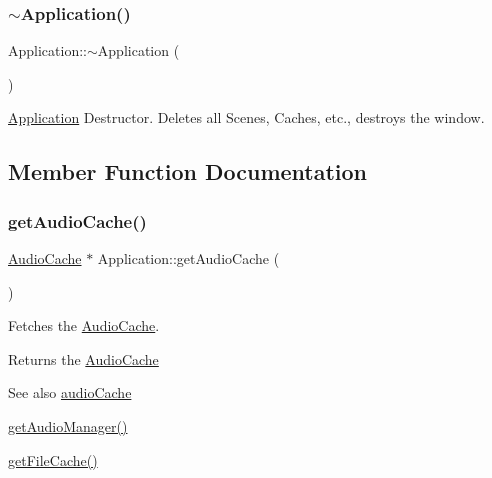 \subsubsection{\texorpdfstring{$\sim$Application()}{~Application()}}
{\footnotesize\ttfamily Application\+::$\sim$\+Application (\begin{DoxyParamCaption}{ }\end{DoxyParamCaption})}



\mbox{\hyperlink{classsage_1_1Application}{Application}} Destructor. Deletes all Scenes, Caches, etc., destroys the window. 



\subsection{Member Function Documentation}
\mbox{\label{classsage_1_1Application_aaed4c540666d784b83d5506e51fb5eaa}} 
\subsubsection{\texorpdfstring{getAudioCache()}{getAudioCache()}}
{\footnotesize\ttfamily \mbox{\hyperlink{classsage_1_1AudioCache}{Audio\+Cache}} $\ast$ Application\+::get\+Audio\+Cache (\begin{DoxyParamCaption}{ }\end{DoxyParamCaption})}



Fetches the \mbox{\hyperlink{classsage_1_1AudioCache}{Audio\+Cache}}. 

\begin{DoxyReturn}{Returns}
the \mbox{\hyperlink{classsage_1_1AudioCache}{Audio\+Cache}} 
\end{DoxyReturn}
\begin{DoxySeeAlso}{See also}
\mbox{\hyperlink{classsage_1_1Application_a38828d2324d2b6a9feae40049eee2aa7}{audio\+Cache}} 

\mbox{\hyperlink{classsage_1_1Application_ac21f1df422a3589af890dc7616b272d7}{get\+Audio\+Manager()}} 

\mbox{\hyperlink{classsage_1_1Application_a782edaec320c507870814d8576f84fba}{get\+File\+Cache()}} 
\end{DoxySeeAlso}
\mbox{\label{classsage_1_1Application_ac21f1df422a3589af890dc7616b272d7}} 
